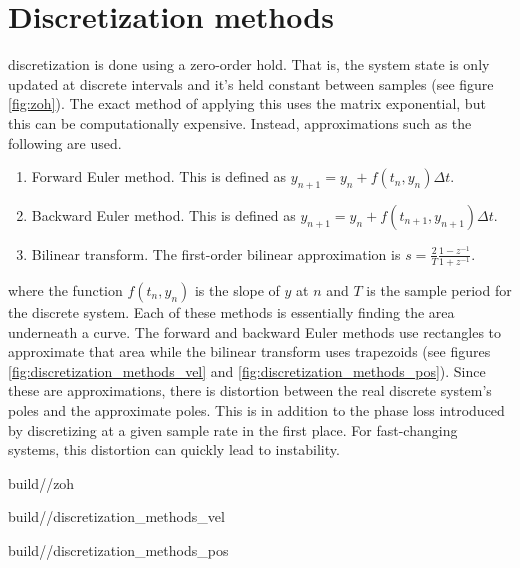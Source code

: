 \section{Discretization methods}

\Gls{discretization} is done using a zero-order hold. That is, the \gls{system}
\gls{state} is only updated at discrete intervals and it's held constant between
samples (see figure \ref{fig:zoh}). The exact method of applying this uses the
matrix exponential, but this can be computationally expensive. Instead,
approximations such as the following are used.
\begin{enumerate}
  \item Forward Euler method. This is defined as
    $y_{n+1} = y_n + f(t_n, y_n) \Delta t$.
  \item Backward Euler method. This is defined as
    $y_{n+1} = y_n + f(t_{n+1}, y_{n+1}) \Delta t$.
  \item Bilinear transform. The first-order bilinear approximation is
    $s = \frac{2}{T} \frac{1 - z^{-1}}{1 + z^{-1}}$.
\end{enumerate}

where the function $f(t_n, y_n)$ is the slope of $y$ at $n$ and $T$ is the
sample period for the discrete \gls{system}. Each of these methods is
essentially finding the area underneath a curve. The forward and backward Euler
methods use rectangles to approximate that area while the bilinear transform
uses trapezoids (see figures \ref{fig:discretization_methods_vel} and
\ref{fig:discretization_methods_pos}). Since these are approximations, there is
distortion between the real discrete \gls{system}'s poles and the approximate
poles. This is in addition to the phase loss introduced by discretizing at a
given sample rate in the first place. For fast-changing \glspl{system}, this
distortion can quickly lead to instability.
\begin{svg}{build/\chapterpath/zoh}
    \caption{Zero-order hold of a system response}
    \label{fig:zoh}
\end{svg}
\begin{svg}{build/\chapterpath/discretization_methods_vel}
  \caption{Discretization methods applied to velocity data}
  \label{fig:discretization_methods_vel}
\end{svg}
\begin{svg}{build/\chapterpath/discretization_methods_pos}
  \caption{Position plot of discretization methods applied to velocity data}
  \label{fig:discretization_methods_pos}
\end{svg}

